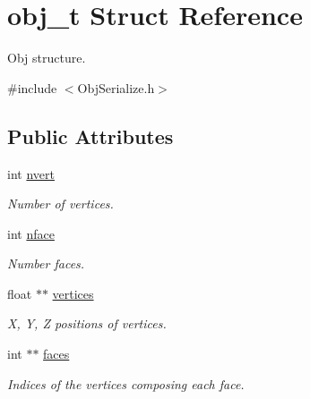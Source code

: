 \hypertarget{structobj__t}{}\section{obj\+\_\+t Struct Reference}
\label{structobj__t}


Obj structure.  




{\ttfamily \#include $<$Obj\+Serialize.\+h$>$}

\subsection*{Public Attributes}
\begin{DoxyCompactItemize}
\item 
\mbox{\label{structobj__t_aa08e8272f5b5f143afac1cab58d30518}} 
int \mbox{\hyperlink{structobj__t_aa08e8272f5b5f143afac1cab58d30518}{nvert}}
\begin{DoxyCompactList}\small\item\em Number of vertices. \end{DoxyCompactList}\item 
\mbox{\label{structobj__t_a28c4194c71f1cd6c719f43c70ee14df6}} 
int \mbox{\hyperlink{structobj__t_a28c4194c71f1cd6c719f43c70ee14df6}{nface}}
\begin{DoxyCompactList}\small\item\em Number faces. \end{DoxyCompactList}\item 
\mbox{\label{structobj__t_a57882cfdbfe09ad7b4a5fcede3681b6b}} 
float $\ast$$\ast$ \mbox{\hyperlink{structobj__t_a57882cfdbfe09ad7b4a5fcede3681b6b}{vertices}}
\begin{DoxyCompactList}\small\item\em X, Y, Z positions of vertices. \end{DoxyCompactList}\item 
\mbox{\label{structobj__t_a450705239dad767420e27d4bb2b1a7cb}} 
int $\ast$$\ast$ \mbox{\hyperlink{structobj__t_a450705239dad767420e27d4bb2b1a7cb}{faces}}
\begin{DoxyCompactList}\small\item\em Indices of the vertices composing each face. \end{DoxyCompactList}\item 

\end{DoxyCompactItemize}
